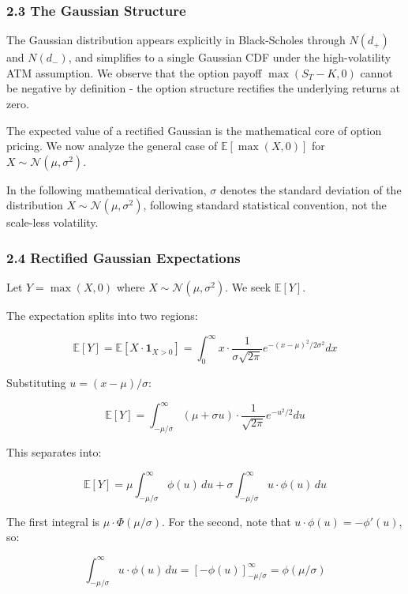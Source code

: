 \documentclass[
  11pt,
  openany]{article}
\begin{document}
\subsubsection{2.3 The Gaussian Structure}\label{the-gaussian-structure}

The Gaussian distribution appears explicitly in Black-Scholes through
\(N(d_+)\) and \(N(d_-)\), and simplifies to a single Gaussian CDF under
the high-volatility ATM assumption. We observe that the option payoff
\(\max(S_T - K, 0)\) cannot be negative by definition - the option
structure rectifies the underlying returns at zero.

The expected value of a rectified Gaussian is the mathematical core of
option pricing. We now analyze the general case of
\(\mathbb{E}[\max(X, 0)]\) for \(X \sim \mathcal{N}(\mu, \sigma^2)\).

In the following mathematical derivation, \(\sigma\) denotes the
standard deviation of the distribution
\(X \sim \mathcal{N}(\mu, \sigma^2)\), following standard statistical
convention, not the scale-less volatility.

\subsubsection{2.4 Rectified Gaussian
Expectations}\label{rectified-gaussian-expectations}

Let \(Y = \max(X, 0)\) where \(X \sim \mathcal{N}(\mu, \sigma^2)\). We
seek \(\mathbb{E}[Y]\).

The expectation splits into two regions:

\[\mathbb{E}[Y] = \mathbb{E}[X \cdot \mathbf{1}_{X > 0}] = \int_0^{\infty} x \cdot \frac{1}{\sigma\sqrt{2\pi}} e^{-(x-\mu)^2/2\sigma^2} dx\]

Substituting \(u = (x - \mu)/\sigma\):

\[\mathbb{E}[Y] = \int_{-\mu/\sigma}^{\infty} (\mu + \sigma u) \cdot \frac{1}{\sqrt{2\pi}} e^{-u^2/2} du\]

This separates into:

\[\mathbb{E}[Y] = \mu \int_{-\mu/\sigma}^{\infty} \phi(u) \, du + \sigma \int_{-\mu/\sigma}^{\infty} u \cdot \phi(u) \, du\]

The first integral is \(\mu \cdot \Phi(\mu/\sigma)\). For the second,
note that \(u \cdot \phi(u) = -\phi'(u)\), so:

\[\int_{-\mu/\sigma}^{\infty} u \cdot \phi(u) \, du = \left[-\phi(u)\right]_{-\mu/\sigma}^{\infty} = \phi(\mu/\sigma)\]
\end{document}
